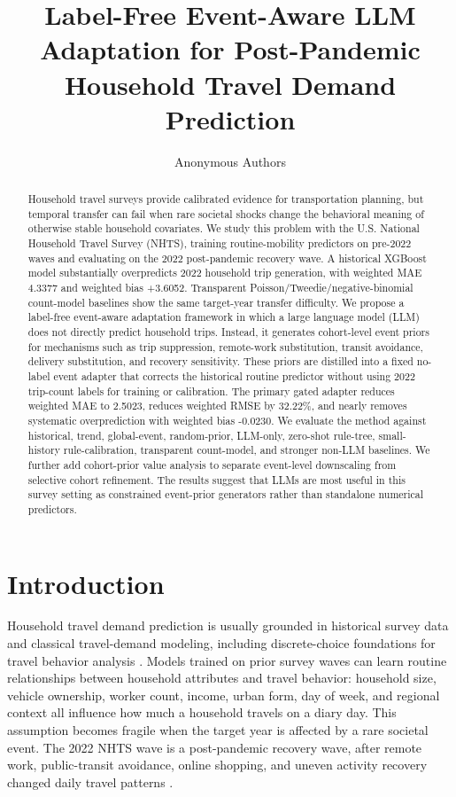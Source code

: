 \documentclass[11pt]{article}
\title{Label-Free Event-Aware LLM Adaptation for Post-Pandemic Household Travel Demand Prediction}
\author{Anonymous Authors}
\date{}
\newcommand{\nhts}{\textsc{NHTS}}
\newcommand{\whmae}{weighted MAE}
\newcommand{\whbias}{weighted bias}
\begin{document}
\maketitle

\begin{abstract}
Household travel surveys provide calibrated evidence for transportation planning, but temporal transfer can fail when rare societal shocks change the behavioral meaning of otherwise stable household covariates.
We study this problem with the U.S. National Household Travel Survey (\nhts), training routine-mobility predictors on pre-2022 waves and evaluating on the 2022 post-pandemic recovery wave.
A historical XGBoost model substantially overpredicts 2022 household trip generation, with \whmae{} 4.3377 and \whbias{} +3.6052.
Transparent Poisson/Tweedie/negative-binomial count-model baselines show the same target-year transfer difficulty.
We propose a label-free event-aware adaptation framework in which a large language model (LLM) does not directly predict household trips.
Instead, it generates cohort-level event priors for mechanisms such as trip suppression, remote-work substitution, transit avoidance, delivery substitution, and recovery sensitivity.
These priors are distilled into a fixed no-label event adapter that corrects the historical routine predictor without using 2022 trip-count labels for training or calibration.
The primary gated adapter reduces \whmae{} to 2.5023, reduces weighted RMSE by 32.22\%, and nearly removes systematic overprediction with \whbias{} -0.0230.
We evaluate the method against historical, trend, global-event, random-prior, LLM-only, zero-shot rule-tree, small-history rule-calibration, transparent count-model, and stronger non-LLM baselines.
We further add cohort-prior value analysis to separate event-level downscaling from selective cohort refinement.
The results suggest that LLMs are most useful in this survey setting as constrained event-prior generators rather than standalone numerical predictors.
\end{abstract}

\section{Introduction}

Household travel demand prediction is usually grounded in historical survey data and classical travel-demand modeling, including discrete-choice foundations for travel behavior analysis \citep{mcfadden1974conditional,benakiva1985discretechoice}.
Models trained on prior survey waves can learn routine relationships between household attributes and travel behavior: household size, vehicle ownership, worker count, income, urban form, day of week, and regional context all influence how much a household travels on a diary day.
This assumption becomes fragile when the target year is affected by a rare societal event.
The 2022 \nhts{} wave is a post-pandemic recovery wave, after remote work, public-transit avoidance, online shopping, and uneven activity recovery changed daily travel patterns \citep{fhwa2022nhts,fhwa2024nhtstrends}.
\end{document}
